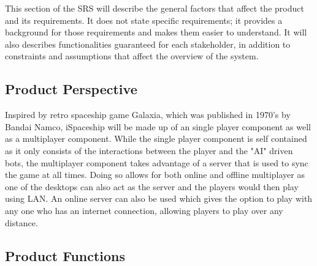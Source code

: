 \documentclass[]{article}
\begin{document}
This section of the SRS will describe the general factors that affect the product and its requirements. It does not state specific requirements; it provides a background for those requirements and makes them easier to understand. It will also describes functionalities guaranteed for each stakeholder, in addition to constraints and assumptions that affect the overview of the system. 

\subsection{Product Perspective}


    Inspired by retro spaceship game Galaxia, which was published in 1970's by Bandai Namco, iSpaceship will be made up of an single player component as well as a multiplayer component. While the single player component is self contained as it only consists of the interactions between the player and the "AI" driven bots, the multiplayer component takes advantage of a server that is used to sync the game at all times. Doing so allows for both online and offline multiplayer as one of the desktops can also act as the server and the players would then play using LAN. An online server can also be used which gives the option to play with any one who has an internet connection, allowing players to play over any distance. 
    
    
\label{sub:product_perspective}

\subsection{Product Functions}
\label{sub:product_functions}
\end{document}
